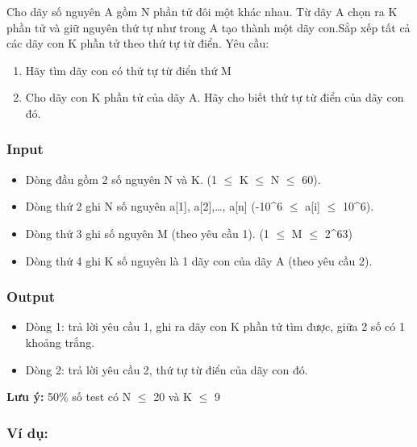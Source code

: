 





   Cho dãy số nguyên A gồm N phần tử đôi một khác nhau. Từ dãy A chọn ra K phần tử và giữ nguyên thứ tự như trong A tạo thành một dãy con.Sắp xếp tất cả các dãy con K phần tử theo thứ tự từ điển. Yêu cầu:  
\begin{enumerate}
	\item     Hãy tìm dãy con có thứ tự từ điển thứ M   
	\item     Cho dãy con K phần tử của dãy A. Hãy cho biết thứ tự từ điển của dãy con đó.   
\end{enumerate}

\subsubsection{   Input  }
\begin{itemize}
	\item     Dòng đầu gồm 2 số nguyên N và K. (1  $\le$  K  $\le$  N  $\le$  60).   
	\item     Dòng thứ 2 ghi N số nguyên a[1], a[2],…, a[n] (-10^6  $\le$  a[i]  $\le$  10^6).   
	\item     Dòng thứ 3 ghi số nguyên M (theo yêu cầu 1). (1  $\le$  M  $\le$  2^63)   
	\item     Dòng thứ 4 ghi K số nguyên là 1 dãy con của dãy A (theo yêu cầu 2).   
\end{itemize}

\subsubsection{   Output  }
\begin{itemize}
	\item 

     Dòng 1: trả lời yêu cầu 1, ghi ra dãy con K phần tử tìm được, giữa 2 số có 1 khoảng trắng.    
	\item     Dòng 2: trả lời yêu cầu 2, thứ tự từ điển của dãy con đó.   
\end{itemize}

\textbf{    Lưu ý:   }   50\% số test có N $\le$ 20 và K $\le$ 9  
\begin{itemize}
\end{itemize}

\subsubsection{   Ví dụ:  }

